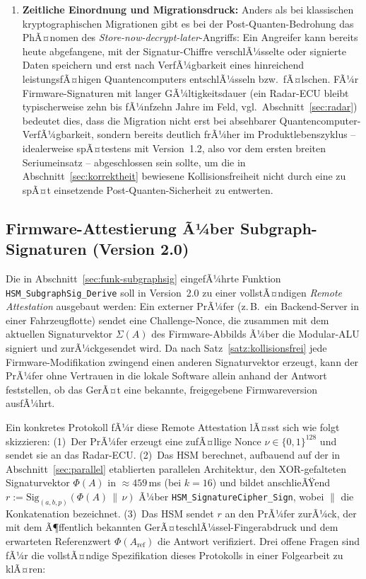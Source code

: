 ﻿\documentclass[a4paper,12pt]{article}
\theoremstyle{definition}
\begin{document}
\begin{enumerate}
	\item \textbf{Zeitliche Einordnung und Migrationsdruck:} Anders als bei klassischen kryptographischen Migrationen gibt es bei der Post-Quanten-Bedrohung das PhÃ¤nomen des \emph{Store-now-decrypt-later}-Angriffs: Ein Angreifer kann bereits heute abgefangene, mit der Signatur-Chiffre verschlÃ¼sselte oder signierte Daten speichern und erst nach VerfÃ¼gbarkeit eines hinreichend leistungsfÃ¤higen Quantencomputers entschlÃ¼sseln bzw.\ fÃ¤lschen. FÃ¼r Firmware-Signaturen mit langer GÃ¼ltigkeitsdauer (ein Radar-ECU bleibt typischerweise zehn bis fÃ¼nfzehn Jahre im Feld, vgl.\ Abschnitt~\ref{sec:radar}) bedeutet dies, dass die Migration nicht erst bei absehbarer Quantencomputer-VerfÃ¼gbarkeit, sondern bereits deutlich frÃ¼her im Produktlebenszyklus -- idealerweise spÃ¤testens mit Version~1.2, also vor dem ersten breiten Seriumeinsatz -- abgeschlossen sein sollte, um die in Abschnitt~\ref{sec:korrektheit} bewiesene Kollisionsfreiheit nicht durch eine zu spÃ¤t einsetzende Post-Quanten-Sicherheit zu entwerten.
\end{enumerate}

\subsection{Firmware-Attestierung Ã¼ber Subgraph-Signaturen (Version 2.0)}

Die in Abschnitt~\ref{sec:funk-subgraphsig} eingefÃ¼hrte Funktion \texttt{HSM\_SubgraphSig\_Derive} soll in Version~2.0 zu einer vollstÃ¤ndigen \emph{Remote Attestation} ausgebaut werden: Ein externer PrÃ¼fer (z.\,B.\ ein Backend-Server in einer Fahrzeugflotte) sendet eine Challenge-Nonce, die zusammen mit dem aktuellen Signaturvektor $\Sigma(A)$ des Firmware-Abbilds Ã¼ber die Modular-ALU signiert und zurÃ¼ckgesendet wird. Da nach Satz~\ref{satz:kollisionsfrei} jede Firmware-Modifikation zwingend einen anderen Signaturvektor erzeugt, kann der PrÃ¼fer ohne Vertrauen in die lokale Software allein anhand der Antwort feststellen, ob das GerÃ¤t eine bekannte, freigegebene Firmwareversion ausfÃ¼hrt.

Ein konkretes Protokoll fÃ¼r diese Remote Attestation lÃ¤sst sich wie folgt skizzieren: (1)~Der PrÃ¼fer erzeugt eine zufÃ¤llige Nonce $\nu \in \{0,1\}^{128}$ und sendet sie an das Radar-ECU. (2)~Das HSM berechnet, aufbauend auf der in Abschnitt~\ref{sec:parallel} etablierten parallelen Architektur, den XOR-gefalteten Signaturvektor $\Phi(A)$ in $\approx 459$\,ms (bei $k=16$) und bildet anschlieÃŸend $r := \mathrm{Sig}_{(a,b,p)}(\Phi(A) \,\|\, \nu)$ Ã¼ber \texttt{HSM\_SignatureCipher\_Sign}, wobei $\|$ die Konkatenation bezeichnet. (3)~Das HSM sendet $r$ an den PrÃ¼fer zurÃ¼ck, der mit dem Ã¶ffentlich bekannten GerÃ¤teschlÃ¼ssel-Fingerabdruck und dem erwarteten Referenzwert $\Phi(A_{\mathrm{ref}})$ die Antwort verifiziert. Drei offene Fragen sind fÃ¼r die vollstÃ¤ndige Spezifikation dieses Protokolls in einer Folgearbeit zu klÃ¤ren:
\end{document}

